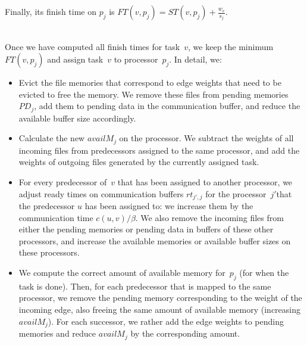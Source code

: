 \documentclass[conference]{IEEEtran}
\begin{document}
  \noindent  Finally, its finish time on $p_j$ is 
    $FT(v,p_j) = ST(v, p_j) + \frac{w_v}{s_j}$.



    \medskip
    \\
    Once we have computed all finish times for task~$v$,
    we keep the minimum $FT(v,p_j)$ and assign task~$v$
    to processor~$p_j$.
    In detail, we:
    \begin{itemize}
        \item  Evict the file memories that correspond to edge weights that need to be evicted to free the memory.
        We remove these files from pending memories
        $PD_j$, add them to pending data in the communication buffer, and reduce the available buffer size accordingly.
        \item    Calculate the new $availM_j$ on the processor.
        We subtract the weights of all incoming files from predecessors assigned to the same processor,
        and add the weights of outgoing files generated by the currently assigned task.
        \item  For every predecessor of~$v$ that has been assigned to another processor, we adjust ready times on
        communication buffers $rt_{j', j}$ for the processor~$j'$that the predecessor $u$ has been assigned to: we increase them by the
        communication time $c( u,v) / \beta$.
        We also remove the incoming files from either the pending memories or pending data in buffers of these other
        processors, and increase the available memories or available buffer sizes on these processors.
        \item We compute the correct amount of available memory for~$p_j$ (for when the task is done).
        Then, for each predecessor that is mapped to the same processor, 
        we remove the pending memory corresponding to the weight of
        the incoming edge, also freeing the same amount of available memory (increasing $availM_j$).
        For each successor, we rather add the edge weights to pending memories and reduce $availM_j$ 
        by the corresponding amount.
    \end{itemize}
\end{document}
